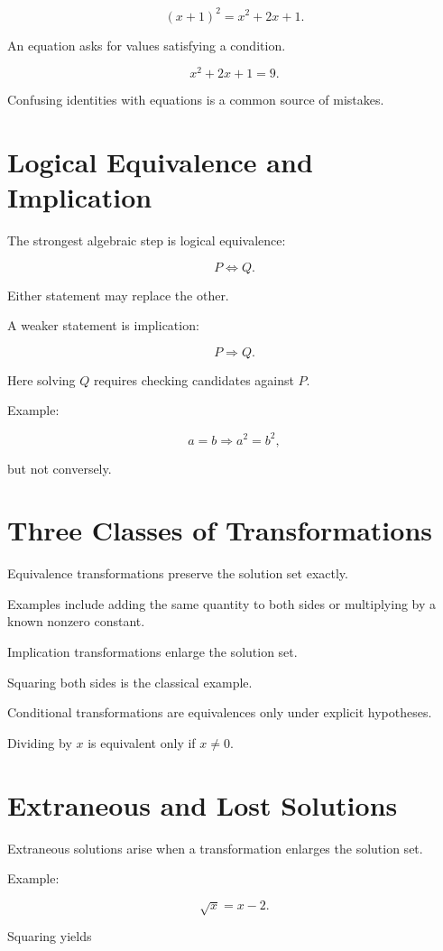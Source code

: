 \documentclass{essay}
\begin{document}
\[ (x+1)^2=x^2+2x+1. \]

An equation asks for values satisfying a condition.

\[ x^2+2x+1=9. \]

Confusing identities with equations is a common source of mistakes.

\section{Logical Equivalence and Implication}

The strongest algebraic step is logical equivalence:

\[ P\iff Q. \]

Either statement may replace the other.

A weaker statement is implication:

\[ P\Rightarrow Q. \]

Here solving $Q$ requires checking candidates against $P$.

Example:

\[ a=b\Rightarrow a^2=b^2, \]

but not conversely.

\section{Three Classes of Transformations}

Equivalence transformations preserve the solution set exactly.

Examples include adding the same quantity to both sides or multiplying by a
known nonzero constant.

Implication transformations enlarge the solution set.

Squaring both sides is the classical example.

Conditional transformations are equivalences only under explicit hypotheses.

Dividing by $x$ is equivalent only if $x\neq0$.

\section{Extraneous and Lost Solutions}

Extraneous solutions arise when a transformation enlarges the solution set.

Example:

\[ \sqrt{x}=x-2. \]

Squaring yields
\end{document}
